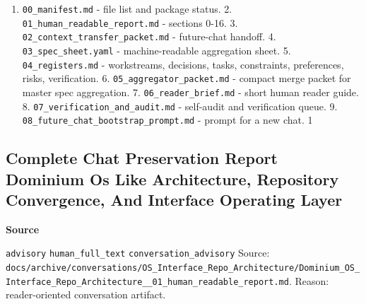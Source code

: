 \documentclass[9pt,a4paper,openany]{book}
\newcommand{\vonecallout}[3]{\par\medskip\noindent\begingroup\setlength{\fboxsep}{7pt}\colorbox{DomCalloutBg}{\parbox{0.94\linewidth}{\textbf{\textcolor{#1}{#2}}\par #3}}\endgroup\par\medskip}
\begin{document}
\begin{enumerate}
\item \texttt{00\_\allowbreak{}manifest.\allowbreak{}md} -\allowbreak{} file list and package status.\allowbreak{} 2.\allowbreak{} \texttt{01\_\allowbreak{}human\_\allowbreak{}readable\_\allowbreak{}report.\allowbreak{}md} -\allowbreak{} sections 0-\allowbreak{}16.\allowbreak{} 3.\allowbreak{} \texttt{02\_\allowbreak{}context\_\allowbreak{}transfer\_\allowbreak{}packet.\allowbreak{}md} -\allowbreak{} future-\allowbreak{}chat handoff.\allowbreak{} 4.\allowbreak{} \texttt{03\_\allowbreak{}spec\_\allowbreak{}sheet.\allowbreak{}yaml} -\allowbreak{} machine-\allowbreak{}readable aggregation sheet.\allowbreak{} 5.\allowbreak{} \texttt{04\_\allowbreak{}registers.\allowbreak{}md} -\allowbreak{} workstreams, decisions, tasks, constraints, preferences, risks, verification.\allowbreak{} 6.\allowbreak{} \texttt{05\_\allowbreak{}aggregator\_\allowbreak{}packet.\allowbreak{}md} -\allowbreak{} compact merge packet for master spec aggregation.\allowbreak{} 7.\allowbreak{} \texttt{06\_\allowbreak{}reader\_\allowbreak{}brief.\allowbreak{}md} -\allowbreak{} short human reader guide.\allowbreak{} 8.\allowbreak{} \texttt{07\_\allowbreak{}verification\_\allowbreak{}and\_\allowbreak{}audit.\allowbreak{}md} -\allowbreak{} self-\allowbreak{}audit and verification queue.\allowbreak{} 9.\allowbreak{} \texttt{08\_\allowbreak{}future\_\allowbreak{}chat\_\allowbreak{}bootstrap\_\allowbreak{}prompt.\allowbreak{}md} -\allowbreak{} prompt for a new chat.\allowbreak{} 1
\end{enumerate}


\subsection{Complete Chat Preservation Report Dominium Os Like Architecture, Repository Convergence, And Interface Operating Layer}

\vonecallout{DomSlate}{Source}{\texttt{advisory} \texttt{human\_\allowbreak{}full\_\allowbreak{}text} \texttt{conversation\_\allowbreak{}advisory} Source: \texttt{docs/\allowbreak{}archive/\allowbreak{}conversations/\allowbreak{}OS\_\allowbreak{}Interface\_\allowbreak{}Repo\_\allowbreak{}Architecture/\allowbreak{}Dominium\_\allowbreak{}OS\_\allowbreak{}Interface\_\allowbreak{}Repo\_\allowbreak{}Architecture\_\allowbreak{}\_\allowbreak{}01\_\allowbreak{}human\_\allowbreak{}readable\_\allowbreak{}report.\allowbreak{}md}.\allowbreak{} Reason: reader-\allowbreak{}oriented conversation artifact.\allowbreak{}}
\end{document}
